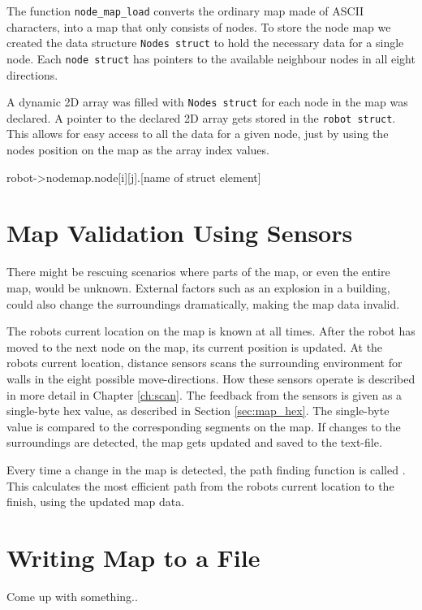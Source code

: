 The function {\tt node\_map\_load} converts the ordinary map made of ASCII characters, into a map that only consists of nodes.
To store the node map we created the data structure {\tt Nodes struct} to hold the necessary data for a single node.
Each {\tt node struct} has pointers to the available neighbour nodes in all eight directions.


A dynamic 2D array was filled with {\tt Nodes struct} for each node in the map was declared. 
A pointer to the declared 2D array gets stored in the {\tt robot struct}.
This allows for easy access to all the data for a given node, just by using the nodes position on the map as the array index values.

robot->nodemap.node[i][j].[name of struct element]

\section{Map Validation Using Sensors}
\label{sec:map_check} %
There might be rescuing scenarios where parts of the map, or even the entire map, would be unknown.
External factors such as an explosion in a building, could also change the surroundings dramatically, making the map data invalid.
 
The robots current location on the map is known at all times. 
After the robot has moved to the next node on the map, its current position is updated.
At the robots current location, distance sensors scans the surrounding environment for walls in the eight possible move-directions.
How these sensors operate is described in more detail in Chapter \ref{ch:scan}.
The feedback from the sensors is given as a single-byte hex value, as described in Section \ref{sec:map_hex}.
The single-byte value is compared to the corresponding segments on the map.
If changes to the surroundings are detected, the map gets updated and saved to the text-file.

Every time a change in the map is detected, the path finding function is called
. 
This calculates the most efficient path from the robots current location to the finish, using the updated map data. 

\section{Writing Map to a File}
\label{sec:map_save} %
Come up with something..



